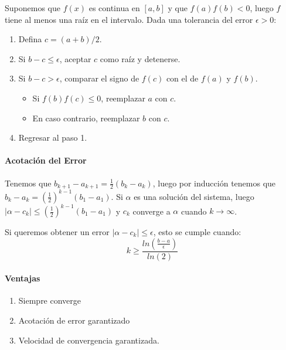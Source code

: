 Suponemos que \(f(x)\) es continua en \([a,b]\) y que \(f(a)f(b) < 0\),
luego \(f\) tiene al menos una raíz en el intervalo. Dada una tolerancia
del error \(\epsilon>0\):

\begin{enumerate}
\def\labelenumi{\arabic{enumi}.}
\tightlist
\item
  Defina \(c = (a+b)/2\).
\item
  Si \(b - c \leq \epsilon\), aceptar \(c\) como raíz y detenerse.
\item
  Si \(b - c > \epsilon\), comparar el signo de \(f(c)\) con el de
  \(f(a)\) y \(f(b)\).

  \begin{itemize}
  \tightlist
  \item
    Si \(f(b)f(c) \leq 0\), reemplazar \(a\) con \(c\).
  \item
    En caso contrario, reemplazar \(b\) con \(c\).
  \end{itemize}
\item
  Regresar al paso 1.
\end{enumerate}

\hypertarget{acotaciuxf3n-del-error}{%
\paragraph{Acotación del Error}\label{acotaciuxf3n-del-error}}

Tenemos que \(b_{k+1} - a_{k+1} = \frac{1}{2}(b_k - a_k)\), luego por
inducción tenemos que \(b_k - a_k = (\frac{1}{2})^{k-1}(b_1 - a_1)\). Si
\(\alpha\) es una solución del sistema, luego
\(|\alpha - c_k| \leq (\frac{1}{2})^{k-1}(b_1 - a_1)\) y \(c_k\)
converge a \(\alpha\) cuando \(k \rightarrow \infty\).

Si queremos obtener un error \(|\alpha - c_k| \leq \epsilon\), esto se
cumple cuando: \[
k \geq \frac{ln(\frac{b-a}{\epsilon})}{ln(2)}
\]

\hypertarget{ventajas}{%
\paragraph{Ventajas}\label{ventajas}}

\begin{enumerate}
\def\labelenumi{\arabic{enumi}.}
\tightlist
\item
  Siempre converge
\item
  Acotación de error garantizado
\item
  Velocidad de convergencia garantizada.
\end{enumerate}


